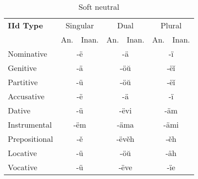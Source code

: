 \begin{table}
	\caption{Soft neutral}
	\begin{tabular}{lllllll}
		\textbf{IId Type}       
		& \multicolumn{2}{c}{Singular} 
		& \multicolumn{2}{c}{Dual} 
		& \multicolumn{2}{c}{Plural} \\
		& An.   & Inan.  & An.   & Inan.   & An.  & Inan. \\
		Nominative    & \multicolumn{2}{c}{-ë}      
		& \multicolumn{2}{c}{-ä}        
		& \multicolumn{2}{c}{-ï} \\
		Genitive      & \multicolumn{2}{c}{-ä}       
		& \multicolumn{2}{c}{-öŭ}      
		& \multicolumn{2}{c}{-ëǐ}   \\
		Partitive     & \multicolumn{2}{c}{-ü}       
		& \multicolumn{2}{c}{-öŭ}      
		& \multicolumn{2}{c}{-ëǐ} \\
		Accusative    & \multicolumn{2}{c}{-ë}     
		& \multicolumn{2}{c}{-ä} 
		& \multicolumn{2}{c}{-ï} \\
		Dative		  & \multicolumn{2}{c}{-ü}       
		& \multicolumn{2}{c}{-ëvi}     
		& \multicolumn{2}{c}{-äm} \\
		Instrumental  & \multicolumn{2}{c}{-ëm}     
		& \multicolumn{2}{c}{-äma}     
		& \multicolumn{2}{c}{-ämi} \\
		Prepositional & \multicolumn{2}{c}{-ě}       
		& \multicolumn{2}{c}{-ëvěh}     
		& \multicolumn{2}{c}{-ěh} \\
		Locative      & \multicolumn{2}{c}{-ü}      
		& \multicolumn{2}{c}{-öŭ}       
		& \multicolumn{2}{c}{-äh} \\ 
		Vocative      & \multicolumn{2}{c}{-ü}       
		& \multicolumn{2}{c}{-ëve}      
		& \multicolumn{2}{c}{-ïe}
	\end{tabular}
\end{table}

